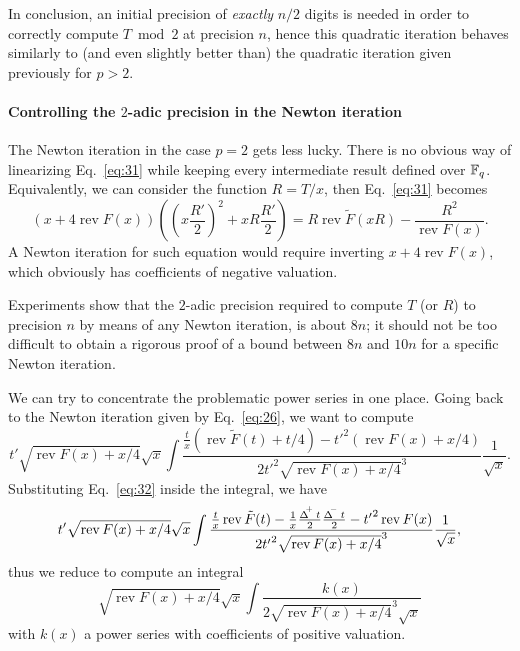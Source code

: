 \documentclass{article}
\DeclareMathOperator{\rev}{rev}
\DeclareMathOperator{\Dplus}{\Delta^{{}^{\kern-0.5ex +}}}
\DeclareMathOperator{\Dminus}{\Delta^{{}^{\kern-0.5ex -}}}
\begin{document}
In conclusion, an initial precision of \emph{exactly} $n/2$ digits is
needed in order to correctly compute $T\bmod 2$ at precision $n$,
hence this quadratic iteration behaves similarly to (and even slightly
better than) the quadratic iteration given previously for $p>2$.


\paragraph{Controlling the $2$-adic precision in the Newton iteration}
The Newton iteration in the case $p=2$ gets less lucky. There is no
obvious way of linearizing Eq.~\eqref{eq:31} while keeping every
intermediate result defined over $\mathbb{F}_q$. Equivalently, we can consider
the function $R = T/x$, then Eq.~\eqref{eq:31} becomes
\begin{equation}
  \label{eq:40}
  (x + 4\rev F(x))\left(\left(x\frac{R'}{2}\right)^2 + xR\frac{R'}{2}\right) =
  R\rev\tilde{F}(xR) - \frac{R^2}{\rev F(x)}.
\end{equation}
A Newton iteration for such equation would require inverting $x +
4\rev F(x)$, which obviously has coefficients of negative valuation.

Experiments show that the $2$-adic precision required to compute $T$
(or $R$) to precision $n$ by means of any Newton iteration, is about
$8n$; it should not be too difficult to obtain a rigorous proof of a
bound between $8n$ and $10n$ for a specific Newton iteration.

We can try to concentrate the problematic power series in one
place. Going back to the Newton iteration given by Eq.~\eqref{eq:26},
we want to compute
\begin{equation}
  \label{eq:41}
  t'\sqrt{\rev F(x) + x/4}\sqrt{x}
  \int \frac{\frac{t}{x}(\rev\tilde{F}(t) + t/4) - {t'}^2(\rev F(x) + x/4)}{2{t'}^2\sqrt{\rev F(x) + x/4}^3}
  \frac{1}{\sqrt{x}}.
\end{equation}
Substituting Eq.~\eqref{eq:32} inside the integral, we have
\begin{equation}
  \label{eq:42}
  t'\sqrt{\rev F(x) + x/4}\sqrt{x}
  \int \frac{\frac{t}{x}\rev\tilde{F}(t) - \frac{1}{x}\frac{\Dplus t}{2}\frac{\Dminus t}{2} - {t'}^2\rev F(x)}{2{t'}^2\sqrt{\rev F(x) + x/4}^3}
  \frac{1}{\sqrt{x}},
\end{equation}
thus we reduce to compute an integral
\begin{equation}
  \label{eq:43}
  \sqrt{\rev F(x) + x/4}\sqrt{x}  \int \frac{k(x)}{2\sqrt{\rev F(x) + x/4}^3\sqrt{x}}
\end{equation}
with $k(x)$ a power series with coefficients of positive valuation.
\end{document}
